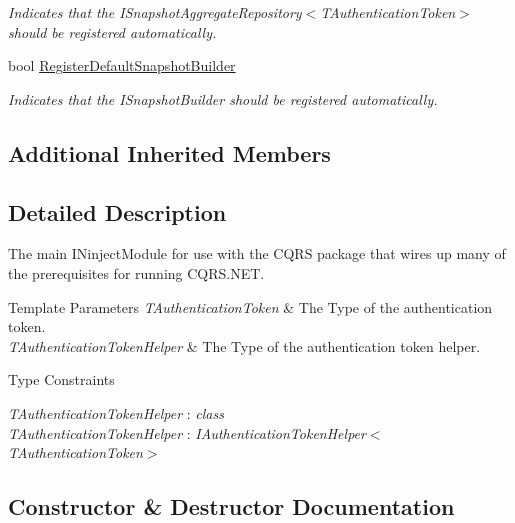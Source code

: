 \begin{DoxyCompactItemize}
\begin{DoxyCompactList}\small\item\em Indicates that the I\+Snapshot\+Aggregate\+Repository$<$\+T\+Authentication\+Token$>$ should be registered automatically. \end{DoxyCompactList}\item 
bool \hyperlink{classCqrs_1_1Ninject_1_1Configuration_1_1CqrsModule_a151dd739535287d044791644b6111324_a151dd739535287d044791644b6111324}{Register\+Default\+Snapshot\+Builder}
\begin{DoxyCompactList}\small\item\em Indicates that the I\+Snapshot\+Builder should be registered automatically. \end{DoxyCompactList}\end{DoxyCompactItemize}
\subsection*{Additional Inherited Members}


\subsection{Detailed Description}
The main I\+Ninject\+Module for use with the C\+Q\+RS package that wires up many of the prerequisites for running C\+Q\+R\+S.\+N\+ET. 


\begin{DoxyTemplParams}{Template Parameters}
{\em T\+Authentication\+Token} & The Type of the authentication token.\\
\hline
{\em T\+Authentication\+Token\+Helper} & The Type of the authentication token helper.\\
\hline
\end{DoxyTemplParams}
\begin{Desc}
\item[Type Constraints]\begin{description}
\item[{\em T\+Authentication\+Token\+Helper} : {\em class}]\item[{\em T\+Authentication\+Token\+Helper} : {\em I\+Authentication\+Token\+Helper$<$T\+Authentication\+Token$>$}]\end{description}
\end{Desc}


\subsection{Constructor \& Destructor Documentation}
\mbox{\label{classCqrs_1_1Ninject_1_1Configuration_1_1CqrsModule_a31a1047d3940842b760ad2a796aa1606_a31a1047d3940842b760ad2a796aa1606}} 
